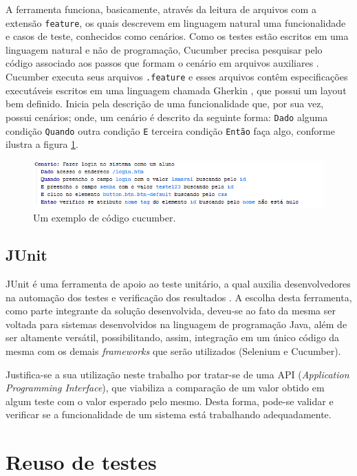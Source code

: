 \documentclass[tg]{mdtufsm}
\begin{document}
A ferramenta funciona, basicamente, através da leitura de arquivos com a extensão \texttt{feature}, os quais descrevem em linguagem natural uma funcionalidade e casos de teste, conhecidos como cenários.
Como os testes estão escritos em uma linguagem natural e não de programação, Cucumber precisa pesquisar pelo código associado aos passos que formam o cenário em arquivos auxiliares \cite{scmitzcucumberreview}. Cucumber
executa seus arquivos \texttt{.feature} e esses arquivos contêm especificações executáveis escritos em uma linguagem chamada Gherkin \cite{cucumberwiki}, que possui um layout bem definido. Inicia pela descrição de uma funcionalidade
que, por sua vez, possui cenários; onde, um cenário é descrito da seguinte forma: \texttt{Dado} alguma condição \texttt{Quando} outra condição \texttt{E} terceira condição \texttt{Então} faça algo, conforme ilustra a figura \ref{fig:codigo_cucumber}.

\begin{figure}[!htb]
	\centering
	\includegraphics[width=1.1
	\textwidth]{codigo_cucumber}
	\caption{Um exemplo de código cucumber.}
	\label{fig:codigo_cucumber}
\end{figure}

\subsection{JUnit}
JUnit é uma ferramenta de apoio ao teste unitário, a qual auxilia desenvolvedores na automação dos testes e verificação dos resultados \cite{biasi2006geraccao}. A escolha desta ferramenta, como parte integrante da solução desenvolvida, deveu-se ao fato da mesma ser voltada para sistemas desenvolvidos na linguagem de programação Java, além de ser altamente versátil, possibilitando, assim, integração em um único código da mesma com os demais \emph{frameworks} que serão utilizados (Selenium e Cucumber).

Justifica-se a sua utilização neste trabalho por tratar-se de uma API (\emph{Application Programming Interface}), que viabiliza a comparação de um valor obtido em algum teste com o valor esperado pelo mesmo. Desta forma, pode-se validar e verificar se
a funcionalidade de um sistema está trabalhando adequadamente.

\section{Reuso de testes}
\end{document}
